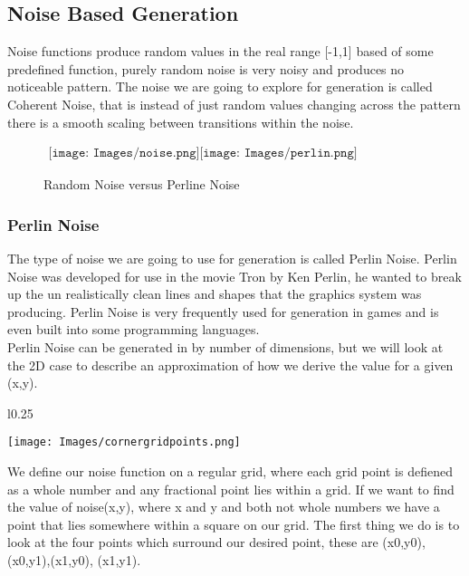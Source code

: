 \subsection{Noise Based Generation}
Noise functions produce random values in the real range [-1,1] based of some 
predefined function, purely random noise is very noisy and produces no noticeable
pattern. The noise we are going to explore for generation is called Coherent
Noise, that is instead of just random values changing across the pattern there 
is a smooth scaling between transitions within the noise.\\

\begin{figure}[h!]
	\begin{center}$
		\begin{array}{cc}
			\texttt{[image: Images/noise.png]}
			\texttt{[image: Images/perlin.png]}
		\end{array}$
	\end{center}
	\caption{Random Noise versus Perline Noise}
\end{figure}
\newpage

\subsubsection*{Perlin Noise}
The type of noise we are going to use for generation is called Perlin Noise. 
Perlin Noise was developed for use in the movie Tron by Ken Perlin, he wanted to
break up the un realistically clean lines and shapes that the graphics system was
producing. Perlin Noise is very frequently used for generation in games and is 
even built into some programming languages.\\

Perlin Noise can be generated in by number of dimensions, but we will look at the
2D case to describe an approximation of how we derive the value for a given 
(x,y).\\
\begin{wrapfigure}{l}{0.25\textwidth}
	\begin{center}
			\texttt{[image: Images/cornergridpoints.png]}
	\end{center}
\end{wrapfigure}

We define our noise function on a regular grid, where each grid point is defiened as
a whole number and any fractional point lies within a grid. If we want to find the
value of noise(x,y), where x and y and both not whole numbers we have a point that
lies somewhere within a square on our grid. The first thing we do is to look at the
four points which surround our desired point, these are (x0,y0),(x0,y1),(x1,y0),
(x1,y1).\\

